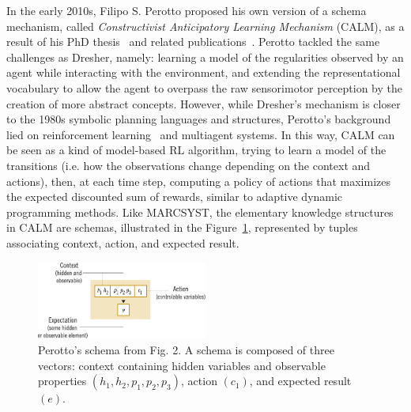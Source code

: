 \documentclass[runningheads]{llncs}
\begin{document}
In the early 2010s, Filipo S. Perotto proposed his own version of a schema mechanism, called \textit{Constructivist Anticipatory Learning Mechanism} (CALM), as a result of his PhD thesis~\cite{Perotto:2010:UFRGS,Perotto:2010:INP} and related publications~\cite{Perotto:2013:CF,Perotto:2006:SGAI,Perotto:2006:AAMAS,Perotto:2007:EpiRob}.
Perotto tackled the same challenges as Dresher, namely: learning a model of the regularities observed by an agent while interacting with the environment, and extending the representational vocabulary to allow the agent to overpass the raw sensorimotor perception by the creation of more abstract concepts.
However, while Dresher's mechanism is closer to the 1980s symbolic planning languages and structures, Perotto's background lied on reinforcement learning~\cite{Sutton:2018} and multiagent systems.
In this way, CALM can be seen as a kind of model-based RL algorithm, trying to learn a model of the transitions (i.e. how the observations change depending on the context and actions), then, at each time step, computing a policy of actions that maximizes the expected discounted sum of rewards, similar to adaptive dynamic programming methods.
Like MARCSYST, the elementary knowledge structures in CALM are schemas, illustrated in the Figure~\ref{fig:perotto_schema}, represented by tuples associating context, action, and expected result.

\begin{figure}
	\centering
	\includegraphics[width=0.5\textwidth]{Figure_4_CALM_schema.pdf}
	\caption{Perotto's schema from \cite{Perotto:2013:CF} Fig. 2.
		A schema is composed of three vectors: context containing hidden variables and observable properties $(h_1, h_2, p_1, p_2, p_3)$, action $(c_1)$, and expected result $(e)$. } 
	\label{fig:perotto_schema}
\end{figure}
\end{document}

